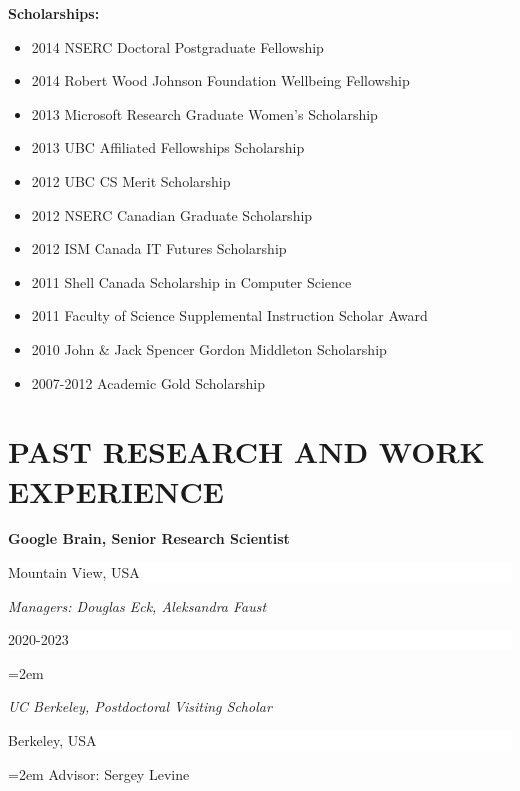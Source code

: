 \documentclass[paper=letter,fontsize=11pt]{scrartcl} %
\newcommand{\sepspace}{\vspace*{1em}}		%
\newcommand{\NewPart}[2]{\section*{\uppercase{#1} #2}}
\newcommand{\ResearchEntry}[5]{
		\noindent \textbf{#1} \hfill      %
		\colorbox{White}{%
			\parbox{10em}{%
			\hfill\color{Black}#2}} \par  %
		\noindent \textit{#3} \hfill      %
		\colorbox{White}{%
			\parbox{6em}{%
			\hfill\color{Black}#4}} \par  %
		\noindent\hangindent=2em\hangafter=0 \small #5 %
		\normalsize \sepspace}
\begin{document}
\noindent \textbf{Scholarships:}
\begin{itemize}
\item 2014 NSERC Doctoral Postgraduate Fellowship
\item 2014 Robert Wood Johnson Foundation Wellbeing Fellowship
\item 2013 Microsoft Research Graduate Women's Scholarship
\item 2013 UBC Affiliated Fellowships Scholarship
\item 2012 UBC CS Merit Scholarship
\item 2012 NSERC Canadian Graduate Scholarship
\item 2012 ISM Canada IT Futures Scholarship
\item 2011 Shell Canada Scholarship in Computer Science
\item 2011 Faculty of Science Supplemental Instruction Scholar Award
\item 2010 John \& Jack Spencer Gordon Middleton Scholarship
\item 2007-2012 Academic Gold Scholarship
\end{itemize}


\NewPart{Past Research and Work Experience}{}

\ResearchEntry{Google Brain, Senior Research Scientist}{Mountain View, USA}{Managers: Douglas Eck, Aleksandra Faust}{2020-2023}%

\ResearchEntry{UC Berkeley, Postdoctoral Visiting Scholar}{Berkeley, USA}{Advisor: Sergey Levine}{2020-2022}%
\end{document}
